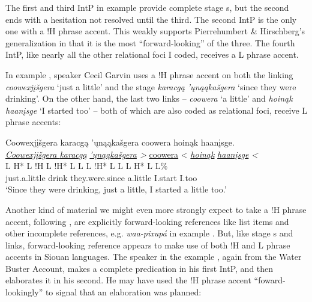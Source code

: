 \documentclass[output=paper]{LSP/langsci}
\begin{document}
The first and third IntP in example  provide complete stage s, but the second ends with a hesitation not resolved until the third. The second IntP is the only one with a !H phrase accent. This weakly supports Pierrehumbert \& Hirschberg’s generalization in that it is the most “forward-looking” of the three. The fourth IntP, like nearly all the other relational foci I coded, receives a L phrase accent.

In example ,  speaker Cecil Garvin uses a !H phrase accent on both the linking \emph{coowexjįšgera} `just a little' and the stage  \emph{karacgą ’ųnąą\-kaš\-ge\-ra} `since they were drinking'. On the other hand, the last two links -- \emph{coowera} `a little' and \emph{hoinąk haanįsge} `I started too' -- both of which are also coded as relational foci, receive L phrase accents:

\ea\label{garvinphraseaccent}
 	Coowexjįšgera karacgą ’ųnąąkašgera coowera hoinąk haanįsge.\footnotemark\\
\glll	\emph{\underline{Coowexjįšgera	}}	\emph{\underline{karacgą}}	\emph{\underline{’ųnąąkašgera}	>}	{\underline{coowera} <}	\emph{\underline{hoinąk}}	\emph{\underline{haanįsge} <}\\
	{\ob L H* L !H\cb}				{\ob L !H* L}				{L\cb}	{\ob L !H* L L\cb}		{\ob L H* L}						{\hspaceThis{haanįs}\ob{}L\%}\\
	just.a.little					drink					they.were.since				a.little				I.start						I.too\\
\glt	`Since they were drinking, just a little, I started a little too.'
\z

Another kind of material we might even more strongly expect to take a !H phrase accent, following \citet{PierrehumbertHirschberg1990}, are explicitly for\-ward-looking references like list items and other incomplete references, e.g. \emph{waa-pi\-xu\-pá} in example . But, like stage s and links, forward-looking reference appears to make use of both !H and L phrase accents in Siouan languages. The speaker in the  example , again from the Water Buster Account, makes a complete predication in his first IntP, and then elaborates it in his second. He may have used the !H phrase accent “foward-lookingly” to signal that an elaboration was planned:
\end{document}
